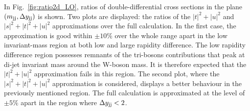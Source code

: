 In Fig.~\ref{fig:ratio2d_LO}, ratios of double-differential cross sections in the plane $\left(m_{\text{j}\text{j}}, \Delta y_{\text{j}\text{j}}\right)$ is shown.
Two plots are displayed: the ratios of the $|t|^2 + |u|^2$ and $|s|^2 + |t|^2 + |u|^2$ approximations over the full calculation.
In the first case, the approximation is good within $\pm10\%$ over the whole range apart in the low invariant-mass region at both low and large rapidity difference.
The low rapidity difference region possesses remnants of the tri-bosons contributions that peak at di-jet invariant mass around the W-boson mass.
It is therefore expected that the $|t|^2 + |u|^2$ approximation fails in this region.
The second plot, where the $|s|^2 + |t|^2 + |u|^2$ approximation is considered, displays a better behaviour in the previously mentioned region.
The full calculation is approximated at the level of $\pm5\%$ apart in the region where $\Delta y_{\text{j}\text{j}} < 2$.

